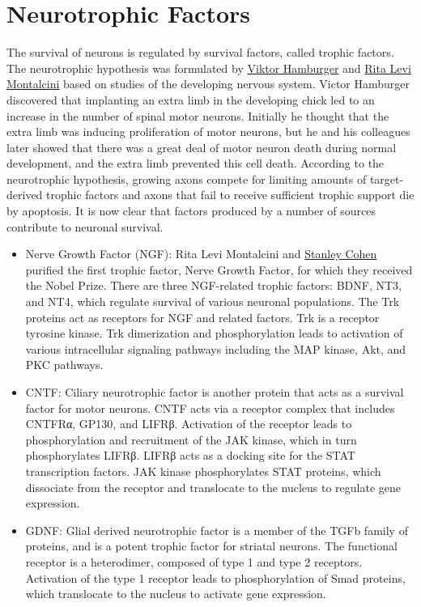 \hypertarget{neurotrophic-factors}{%
\section{Neurotrophic Factors}\label{neurotrophic-factors}}

The survival of neurons is regulated by survival factors, called trophic factors. The neurotrophic hypothesis was formulated by \href{https://en.wikipedia.org/wiki/Viktor_Hamburger}{Viktor Hamburger} and \href{https://en.wikipedia.org/wiki/Rita_Levi-Montalcini}{Rita Levi Montalcini} based on studies of the developing nervous system. Victor Hamburger discovered that implanting an extra limb in the developing chick led to an increase in the number of spinal motor neurons. Initially he thought that the extra limb was inducing proliferation of motor neurons, but he and his colleagues later showed that there was a great deal of motor neuron death during normal development, and the extra limb prevented this cell death. According to the neurotrophic hypothesis, growing axons compete for limiting amounts of target-derived trophic factors and axons that fail to receive sufficient trophic support die by apoptosis. It is now clear that factors produced by a number of sources contribute to neuronal survival.

\begin{itemize}
\tightlist
\item
  Nerve Growth Factor (NGF): Rita Levi Montalcini and \href{https://en.wikipedia.org/wiki/Stanley_Cohen_(biochemist)}{Stanley Cohen} purified the first trophic factor, Nerve Growth Factor, for which they received the Nobel Prize. There are three NGF-related trophic factors: BDNF, NT3, and NT4, which regulate survival of various neuronal populations. The Trk proteins act as receptors for NGF and related factors. Trk is a receptor tyrosine kinase. Trk dimerization and phosphorylation leads to activation of various intracellular signaling pathways including the MAP kinase, Akt, and PKC pathways.
\item
  CNTF: Ciliary neurotrophic factor is another protein that acts as a survival factor for motor neurons. CNTF acts via a receptor complex that includes CNTFRα, GP130, and LIFRβ. Activation of the receptor leads to phosphorylation and recruitment of the JAK kinase, which in turn phosphorylates LIFRβ. LIFRβ acts as a docking site for the STAT transcription factors. JAK kinase phosphorylates STAT proteins, which dissociate from the receptor and translocate to the nucleus to regulate gene expression.
\item
  GDNF: Glial derived neurotrophic factor is a member of the TGFb family of proteins, and is a potent trophic factor for striatal neurons. The functional receptor is a heterodimer, composed of type 1 and type 2 receptors. Activation of the type 1 receptor leads to phosphorylation of Smad proteins, which translocate to the nucleus to activate gene expression.
\end{itemize}

